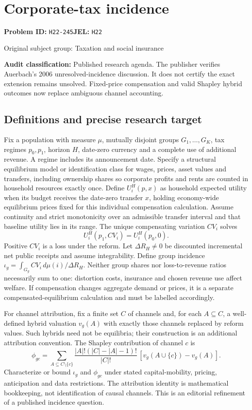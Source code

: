 \documentclass[11pt,a4paper]{article}
\begin{document}
\section*{Corporate-tax incidence}
\textbf{Problem ID:} \texttt{H22-245}\quad \textbf{JEL:} \texttt{H22}\par
\label{problem:OP-0474}
{\sffamily\small\color{muted}Original subject group: Taxation and social insurance\par}
\label{definitions:problem:30007756}
\textbf{Audit classification:} Published research agenda. The publisher verifies Auerbach’s 2006 unresolved-incidence discussion. It does not certify the exact extension remains unsolved. Fixed-price compensation and valid Shapley hybrid outcomes now replace ambiguous channel accounting.
\subsection*{Definitions and precise research target}
Fix a population with measure \(\mu\), mutually disjoint groups \(G_1,\ldots,G_K\), tax regimes \(p_0,p_1\), horizon \(H\), date-zero currency and a complete use of additional revenue. A regime includes its announcement date. Specify a structural equilibrium model or identification class for wages, prices, asset values and transfers, including ownership shares so corporate profits and rents are counted in household resources exactly once. Define \(U_i^H(p,x)\) as household expected utility when its budget receives the date-zero transfer \(x\), holding economy-wide equilibrium prices fixed for this individual compensation calculation. Assume continuity and strict monotonicity over an admissible transfer interval and that baseline utility lies in its range. The unique compensating variation \(CV_i\) solves
\[
 U_i^H(p_1,CV_i)=U_i^H(p_0,0).
\]
Positive \(CV_i\) is a loss under the reform. Let \(\Delta R_H\ne0\) be discounted incremental net public receipts and assume integrability. Define group incidence \(\iota_g=\int_{G_g}CV_i\,d\mu(i)/\Delta R_H\). Neither group shares nor loss-to-revenue ratios necessarily sum to one: distortion costs, insurance and chosen revenue use affect welfare. If compensation changes aggregate demand or prices, it is a separate compensated-equilibrium calculation and must be labelled accordingly.

For channel attribution, fix a finite set \(C\) of channels and, for each \(A\subseteq C\), a well-defined hybrid valuation \(v_g(A)\) with exactly those channels replaced by reform values. Such hybrids need not be equilibria; their construction is an additional attribution convention. The Shapley contribution of channel \(c\) is
\[
 \phi_{gc}=\sum_{A\subseteq C\setminus\{c\}}
 \frac{|A|!(|C|-|A|-1)!}{|C|!}\,[v_g(A\cup\{c\})-v_g(A)].
\]
Characterize or bound \(\iota_g\) and \(\phi_{gc}\) under stated capital-mobility, pricing, anticipation and data restrictions. The attribution identity is mathematical bookkeeping, not identification of causal channels. This is an editorial refinement of a published incidence question.
\end{document}
